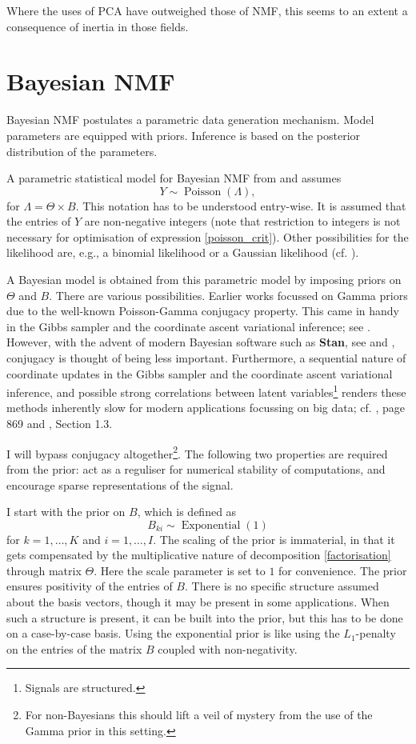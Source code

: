 \documentclass[]{article}
\begin{document}
Where the uses of PCA have outweighed those of NMF, this seems to an extent a consequence of inertia in those fields.

\section{Bayesian NMF}

Bayesian NMF postulates a parametric data generation mechanism. Model parameters are equipped with priors. Inference is based on the posterior distribution of the parameters.

A parametric statistical model for Bayesian NMF from \citet{virtanen2008} and \citet{cemgil2009} assumes 
\[
Y \sim \operatorname{Poisson}(\Lambda),
\]
for $ \Lambda = \Theta \times B$. This notation has to be understood entry-wise. It is assumed that the entries of $Y$ are non-negative integers (note that restriction to integers is not necessary for optimisation of expression \eqref{poisson_crit}). Other possibilities for the likelihood are, e.g., a binomial likelihood or a Gaussian likelihood (cf. \citet{mnih2007}).

A Bayesian model is obtained from this parametric model by imposing priors on $\Theta$ and $B$. There are various possibilities. Earlier works focussed on Gamma priors due to the well-known Poisson-Gamma conjugacy property. This came in handy in the Gibbs sampler and the coordinate ascent variational inference; see \citet{cemgil2009}. However, with the advent of modern Bayesian software such as {\bf{Stan}}, see \citet{carpenter2017} and \citet{stan2024}, conjugacy is thought of being less important. Furthermore, a sequential nature of coordinate updates in the Gibbs sampler and the coordinate ascent variational inference, and possible strong correlations between latent variables\footnote{Signals are structured.} renders these methods inherently slow for modern applications focussing on big data; cf. \citet{blei2017}, page 869 and \citet{lindsten2013}, Section 1.3.

I will bypass conjugacy altogether\footnote{For non-Bayesians this should lift a veil of mystery from the use of the Gamma prior in this setting.}. The following two properties are required from the prior: act as a reguliser for numerical stability of computations, and encourage sparse representations of the signal.

I start with the prior on $B$, which is defined as
\[
B_{ki} \sim \operatorname{Exponential}(1)
\]
for $k=1,\ldots,K$ and $ i = 1,\ldots , I.$ The scaling of the prior is immaterial, in that it gets compensated by the multiplicative nature of decomposition \eqref{factorisation} through matrix $\Theta$. Here the scale parameter is set to $1$ for convenience. The prior ensures positivity of the entries of $B$. There is no specific structure assumed about the basis vectors, though it may be present in some applications. When such a structure is present, it can be built into the prior, but this has to be done on a case-by-case basis. Using the exponential prior is like using the $L_1$-penalty on the entries of the matrix $B$ coupled with non-negativity.
\end{document}
